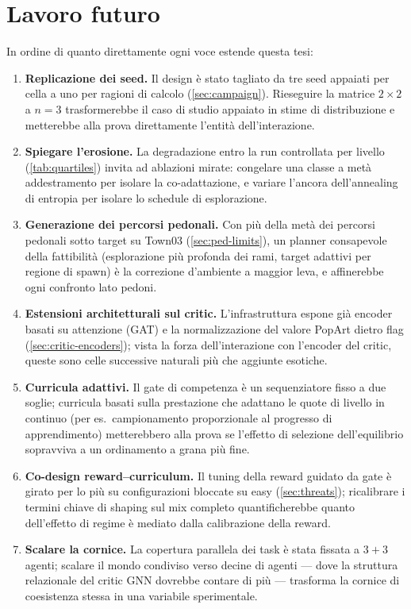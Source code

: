 \section{Lavoro futuro}
\label{sec:future}

In ordine di quanto direttamente ogni voce estende questa tesi:

\begin{enumerate}
  \item \textbf{Replicazione dei seed.} Il design è stato tagliato da
        tre seed appaiati per cella a uno per ragioni di calcolo
        (\cref{sec:campaign}). Rieseguire la matrice $2\times2$ a
        $n{=}3$ trasformerebbe il caso di studio appaiato in stime di
        distribuzione e metterebbe alla prova direttamente l'entità
        dell'interazione.
  \item \textbf{Spiegare l'erosione.} La degradazione entro la run
        controllata per livello (\cref{tab:quartiles}) invita ad
        ablazioni mirate: congelare una classe a metà addestramento per
        isolare la co-adattazione, e variare l'ancora dell'annealing di
        entropia per isolare lo schedule di esplorazione.
  \item \textbf{Generazione dei percorsi pedonali.} Con più della metà
        dei percorsi pedonali sotto target su Town03
        (\cref{sec:ped-limits}), un planner consapevole della
        fattibilità (esplorazione più profonda dei rami, target
        adattivi per regione di spawn) è la correzione d'ambiente a
        maggior leva, e affinerebbe ogni confronto lato pedoni.
  \item \textbf{Estensioni architetturali sul critic.}
        L'infrastruttura espone già encoder basati su attenzione (GAT)
        e la normalizzazione del valore PopArt dietro flag
        (\cref{sec:critic-encoders}); vista la forza dell'interazione
        con l'encoder del critic, queste sono celle successive naturali
        più che aggiunte esotiche.
  \item \textbf{Curricula adattivi.} Il gate di competenza è un
        sequenziatore fisso a due soglie; curricula basati sulla
        prestazione che adattano le quote di livello in continuo (per
        es.\ campionamento proporzionale al progresso di apprendimento)
        metterebbero alla prova se l'effetto di selezione
        dell'equilibrio sopravviva a un ordinamento a grana più fine.
  \item \textbf{Co-design reward--curriculum.} Il tuning della reward
        guidato da gate è girato per lo più su configurazioni bloccate
        su easy (\cref{sec:threats}); ricalibrare i termini chiave di
        shaping sul mix completo quantificherebbe quanto dell'effetto
        di regime è mediato dalla calibrazione della reward.
  \item \textbf{Scalare la cornice.} La copertura parallela dei task è
        stata fissata a $3{+}3$ agenti; scalare il mondo condiviso
        verso decine di agenti --- dove la struttura relazionale del
        critic GNN dovrebbe contare di più --- trasforma la cornice di
        coesistenza stessa in una variabile sperimentale.
\end{enumerate}
